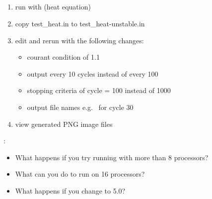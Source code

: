 \NEWSEC

\subsection{\ssParamActivity}

\begin{frame}[fragile,label=ss-param-activity] 
\secframetitle{\ssParamActivity}
  \begin{enumerate}
  \item run  with  (heat equation)
  \item copy test\_heat.in to test\_heat-unstable.in
  \item edit and rerun with the following changes:
    \begin{itemize}
    \item courant condition of 1.1
    \item output every 10 cycles instead of every 100
    \item stopping criteria of cycle = 100 instead of 1000
    \item output file names e.g.~ for cycle 30
    \end{itemize}
  \item view generated PNG image files
  \end{enumerate}
\footnotesize
{}:
  \begin{itemize}
\item What happens if you try running  with more than 8 processors?
\item What can you do to run on 16 processors?
\item What happens if you change  to 5.0?
  \end{itemize}
\end{frame}

